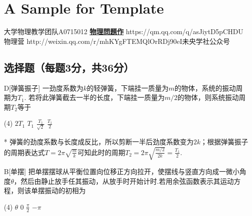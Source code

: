 \chapter{A Sample for  Template}
\fancyhead[R]{\color{H6}\kaishu\rightmark\,}

\date{2023年12月3日}{大学物理教学团队}{A0715012}
{\href{https://qm.qq.com/q/UPbGudx8cK}{\textbf{物理問題作}}}
{https://qm.qq.com/q/asJiytD5pC}{HDU 物理营}
{http://weixin.qq.com/r/mhKYgFTEMQlOrRDj90eI}{未央学社公众号}

\section{选择题（每题3分，共36分）}
\begin{choice}{D}[弹簧振子]
    一劲度系数为$k$的轻弹簧，下端挂一质量为$m$的物体，系统的振动周期为$T_1$. 若将此弹簧截去一半的长度，下端挂一质量为$m/2$的物体，则系统振动周期$T_2$等于
\begin{tasks}(4)
    \task $2T_1$
    \task $T_1$
    \task $\frac{T_1}{\sqrt2}$
    \task $\frac{T_1}{2}$
\end{tasks}
\end{choice}
\begin{solution}*
    弹簧的劲度系数与长度成反比，所以剪断一半后劲度系数变为$2k$；根据弹簧振子的周期表达式$T=2\pi\sqrt{\frac mk}$可知此时的周期$T_2=2\pi\sqrt{\frac{m/2}{2k}}=\frac{T_1}{2}$.
\end{solution}

\begin{choice}{B}[单摆]
    把单摆摆球从平衡位置向位移正方向拉开，使摆线与竖直方向成一微小角度$\theta$，然后由静止放手任其振动，从放手时开始计时.若用余弦函数表示其运动方程，则该单摆振动的初相为
    \begin{tasks}(4)
        \task $\theta$
        \task $0$
        \task $\frac\pi2$
        \task $-\pi$
    \end{tasks}
\end{choice}

